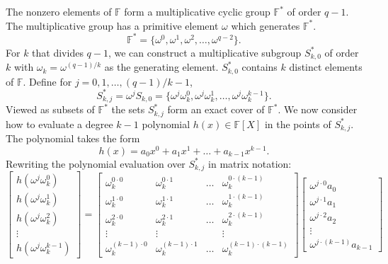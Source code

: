 \documentclass[a4paper,11pt]{article}
\theoremstyle{plain}
\theoremstyle{definition}
\newcommand{\F}{\mathbb{F}}
\newcommand{\colvec}[1]{\begin{bmatrix}#1\end{bmatrix}}
\begin{document}
The nonzero elements of $\F$ form a multiplicative cyclic group $\F^{*}$ of order $q-1$. 
The multiplicative group has a primitive element $\omega$ which generates $\F^{*}$.
\begin{equation}
\F^{*} = \{ \omega^{0}, \omega^{1}, \omega^{2}, \dots, \omega^{q-2} \}.
\end{equation}
For $k$ that divides $q-1$, we can construct a multiplicative subgroup $S_{k,0}^{*}$ of order $k$ with $\omega_{k} = \omega^{(q-1)/k}$ as the generating element. 
$S_{k,0}^{*}$ contains $k$ distinct elements of $\F$. 
Define for $j = 0,1, \dots, (q-1)/k - 1$, 
\begin{equation}
S_{k,j}^{*} = \omega^{j}S_{k,0} = \{ \omega^{j}\omega_{k}^{0}, \omega^{j}\omega_{k}^{1}, \dots, \omega^{j}\omega_{k}^{k-1} \}.  
\end{equation}
Viewed as subsets of $\F^{*}$ the sets $S_{k,j}^{*}$ form an exact cover of $\F^{*}$. 
We now consider how to evaluate a degree $k-1$ polynomial $h(x) \in \F[X]$ in the points of $S_{k,j}^{*}$. The polynomial takes the form
\begin{equation}
h(x) = a_{0}x^{0} + a_{1}x^{1} + \dots + a_{k-1}x^{k-1}.
\end{equation}
Rewriting the polynomial evaluation over $S_{k,j}^{*}$ in matrix notation:
\begin{equation}
\colvec{ h(\omega^{j}\omega_{k}^{0}) \\  h(\omega^{j}\omega_{k}^{1}) \\ h(\omega^{j}\omega_{k}^{2}) \\ \vdots \\ h(\omega^{j}\omega_{k}^{k-1})} = 
\colvec{
	\omega_{k}^{0\cdot0} & \omega_{k}^{0\cdot1} & \dots & \omega_{k}^{0\cdot(k-1)} \\
	\omega_{k}^{1\cdot0} & \omega_{k}^{1\cdot1} & \dots & \omega_{k}^{1\cdot(k-1)} \\
	\omega_{k}^{2\cdot0} & \omega_{k}^{2\cdot1} & \dots & \omega_{k}^{2\cdot(k-1)} \\
	\vdots & \vdots &  & \vdots \\
	\omega_{k}^{(k-1)\cdot0} & \omega_{k}^{(k-1)\cdot1} & \dots & \omega_{k}^{(k-1)\cdot(k-1)}
}
\colvec{\omega^{j \cdot 0}a_{0} \\ \omega^{j \cdot 1}a_{1} \\ \omega^{j \cdot 2}a_{2} \\ \vdots \\ \omega^{j \cdot (k-1)}a_{k-1}}
\label{eq:polymatrix}
\end{equation}
\end{document}
